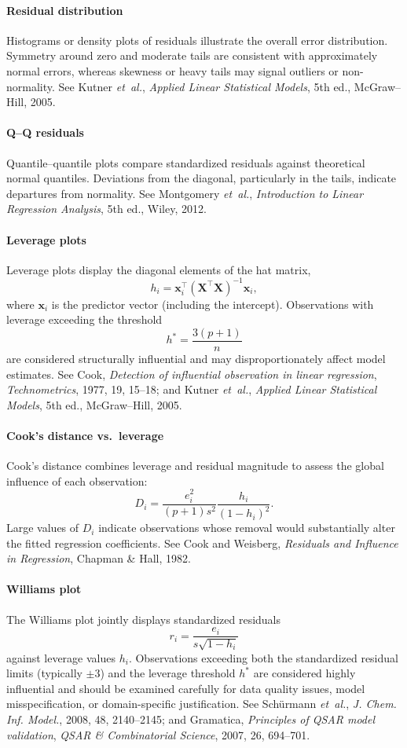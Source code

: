 \documentclass[11pt,a4paper]{article}
\begin{document}
\paragraph{Residual distribution}
Histograms or density plots of residuals illustrate the overall error distribution. Symmetry around zero and moderate tails are consistent with approximately normal errors, whereas skewness or heavy tails may signal outliers or non-normality.
See Kutner \emph{et~al.}, \emph{Applied Linear Statistical Models}, 5th ed., McGraw--Hill, 2005.

\paragraph{Q--Q residuals}
Quantile--quantile plots compare standardized residuals against theoretical normal quantiles. Deviations from the diagonal, particularly in the tails, indicate departures from normality.
See Montgomery \emph{et~al.}, \emph{Introduction to Linear Regression Analysis}, 5th ed., Wiley, 2012.

\paragraph{Leverage plots}
Leverage plots display the diagonal elements of the hat matrix,
\[
h_i
=
\mathbf{x}_i^\top
(\mathbf{X}^\top \mathbf{X})^{-1}
\mathbf{x}_i,
\]
where $\mathbf{x}_i$ is the predictor vector (including the intercept). Observations with leverage exceeding the threshold
\[
h^\ast = \frac{3(p+1)}{n}
\]
are considered structurally influential and may disproportionately affect model estimates.
See Cook, \emph{Detection of influential observation in linear regression}, \emph{Technometrics}, 1977, 19, 15--18; and Kutner \emph{et~al.}, \emph{Applied Linear Statistical Models}, 5th ed., McGraw--Hill, 2005.

\paragraph{Cook’s distance vs.\ leverage}
Cook’s distance combines leverage and residual magnitude to assess the global influence of each observation:
\[
D_i
=
\frac{e_i^2}{(p+1)s^2}
\frac{h_i}{(1-h_i)^2}.
\]
Large values of $D_i$ indicate observations whose removal would substantially alter the fitted regression coefficients.
See Cook and Weisberg, \emph{Residuals and Influence in Regression}, Chapman \& Hall, 1982.

\paragraph{Williams plot}
The Williams plot jointly displays standardized residuals
\[
r_i
=
\frac{e_i}{s\sqrt{1-h_i}}
\]
against leverage values $h_i$. Observations exceeding both the standardized residual limits (typically $\pm 3$) and the leverage threshold $h^\ast$ are considered highly influential and should be examined carefully for data quality issues, model misspecification, or domain-specific justification.
See Sch\"{u}rmann \emph{et~al.}, \emph{J. Chem. Inf. Model.}, 2008, 48, 2140--2145; and Gramatica, \emph{Principles of QSAR model validation}, \emph{QSAR \& Combinatorial Science}, 2007, 26, 694--701.
\end{document}
